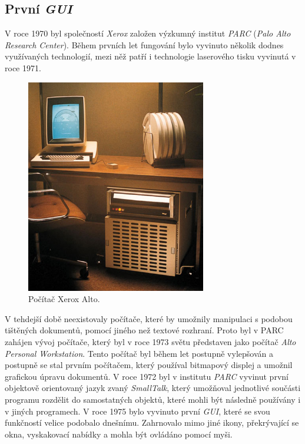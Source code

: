 \documentclass[11pt,twoside,a4paper]{book}
\begin{document}
\subsection{První \textit{GUI}}
V roce 1970 byl společností \textit{Xerox} založen výzkumný institut \textit{PARC} (\textit{Palo Alto Research Center}). Během prvních let fungování bylo vyvinuto několik dodnes využívaných technologií, mezi něž patří i technologie laserového tisku vyvinutá v roce 1971. 
\begin{figure}[!ht]
\begin{center}
  \includegraphics[width=0.7\textwidth]{XeroxAlto}
\caption{{\label{fig:alto}}Počítač Xerox Alto.}
\end{center}
\end{figure}
V tehdejší době neexistovaly počítače, které by umožnily manipulaci s podobou tištěných dokumentů, pomocí jiného než textové rozhraní. Proto byl v PARC zahájen vývoj počítače, který byl v roce 1973 světu představen jako počítač \textit{Alto Personal Workstation}. Tento počítač byl během let postupně vylepšován a postupně se stal prvním počítačem, který používal bitmapový displej a umožnil grafickou úpravu dokumentů. V roce 1972 byl v institutu \textit{PARC} vyvinut první objektově orientovaný jazyk zvaný \textit{SmallTalk}, který umožňoval jednotlivé součásti programu rozdělit do samostatných objektů, které mohli být následně používány i v jiných programech. V roce 1975 bylo vyvinuto první \textit{GUI}, které se svou funkčností velice podobalo dnešnímu. Zahrnovalo mimo jiné ikony, překrývající se okna, vyskakovací nabídky a mohla být ovládáno pomocí myši. \cite{bib:PARC}
\end{document}
